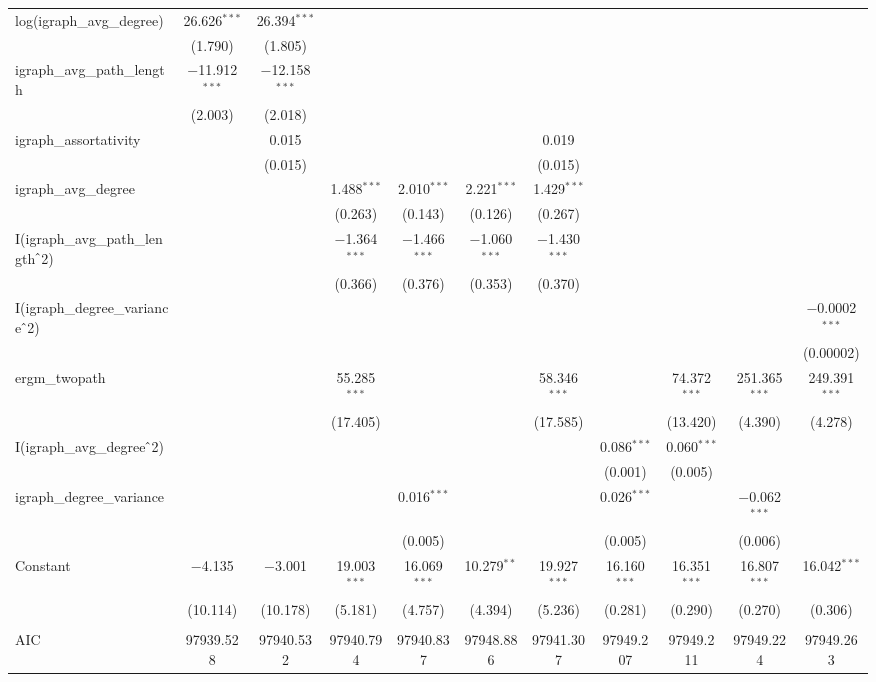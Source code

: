 \begin{table}[!htbp]
\begin{tabular}{@{\extracolsep{5pt}}lcccccccccc}
  log(igraph\_avg\_degree) & 26.626$^{***}$ & 26.394$^{***}$ &  &  &  &  &  &  &  &  \\ 
  & (1.790) & (1.805) &  &  &  &  &  &  &  &  \\ 
  igraph\_avg\_path\_length & $-$11.912$^{***}$ & $-$12.158$^{***}$ &  &  &  &  &  &  &  &  \\ 
  & (2.003) & (2.018) &  &  &  &  &  &  &  &  \\ 
  igraph\_assortativity &  & 0.015 &  &  &  & 0.019 &  &  &  &  \\ 
  &  & (0.015) &  &  &  & (0.015) &  &  &  &  \\ 
  igraph\_avg\_degree &  &  & 1.488$^{***}$ & 2.010$^{***}$ & 2.221$^{***}$ & 1.429$^{***}$ &  &  &  &  \\ 
  &  &  & (0.263) & (0.143) & (0.126) & (0.267) &  &  &  &  \\ 
  I(igraph\_avg\_path\_length$\hat{\mkern6mu}$2) &  &  & $-$1.364$^{***}$ & $-$1.466$^{***}$ & $-$1.060$^{***}$ & $-$1.430$^{***}$ &  &  &  &  \\ 
  &  &  & (0.366) & (0.376) & (0.353) & (0.370) &  &  &  &  \\ 
  I(igraph\_degree\_variance$\hat{\mkern6mu}$2) &  &  &  &  &  &  &  &  &  & $-$0.0002$^{***}$ \\ 
  &  &  &  &  &  &  &  &  &  & (0.00002) \\ 
  ergm\_twopath &  &  & 55.285$^{***}$ &  &  & 58.346$^{***}$ &  & 74.372$^{***}$ & 251.365$^{***}$ & 249.391$^{***}$ \\ 
  &  &  & (17.405) &  &  & (17.585) &  & (13.420) & (4.390) & (4.278) \\ 
  I(igraph\_avg\_degree$\hat{\mkern6mu}$2) &  &  &  &  &  &  & 0.086$^{***}$ & 0.060$^{***}$ &  &  \\ 
  &  &  &  &  &  &  & (0.001) & (0.005) &  &  \\ 
  igraph\_degree\_variance &  &  &  & 0.016$^{***}$ &  &  & 0.026$^{***}$ &  & $-$0.062$^{***}$ &  \\ 
  &  &  &  & (0.005) &  &  & (0.005) &  & (0.006) &  \\ 
  Constant & $-$4.135 & $-$3.001 & 19.003$^{***}$ & 16.069$^{***}$ & 10.279$^{**}$ & 19.927$^{***}$ & 16.160$^{***}$ & 16.351$^{***}$ & 16.807$^{***}$ & 16.042$^{***}$ \\ 
  & (10.114) & (10.178) & (5.181) & (4.757) & (4.394) & (5.236) & (0.281) & (0.290) & (0.270) & (0.306) \\ 
 \hline \\[-1.8ex] 
AIC & 97939.528 & 97940.532 & 97940.794 & 97940.837 & 97948.886 & 97941.307 & 97949.207 & 97949.211 & 97949.224 & 97949.263 \\ 

\end{tabular}
\end{table}
